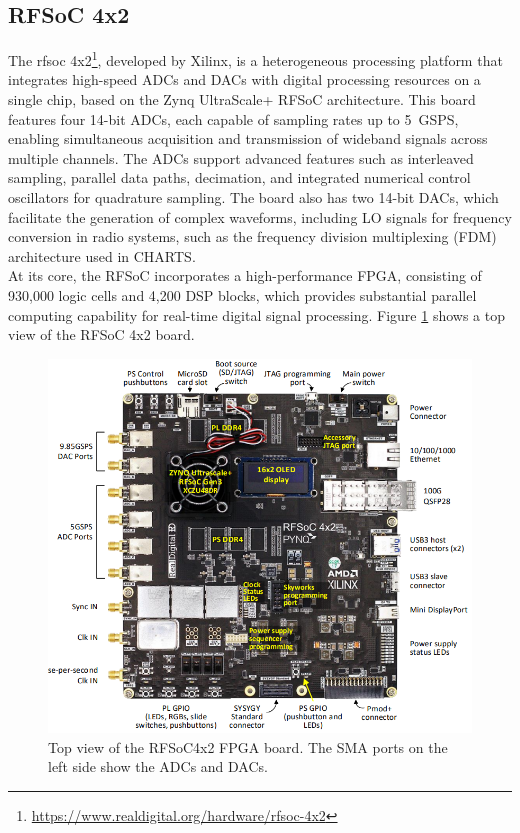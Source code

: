 \subsection{RFSoC 4x2}
\label{sec:rfsoc}
The \Gls{rfsoc} 4x2\footnote{\url{https://www.realdigital.org/hardware/rfsoc-4x2}}, developed by Xilinx, is a heterogeneous processing platform that integrates high-speed ADCs and DACs with digital processing resources on a single chip, based on the Zynq UltraScale+ RFSoC architecture. This board features four 14-bit ADCs, each capable of sampling rates up to 5~GSPS, enabling simultaneous acquisition and transmission of wideband signals across multiple channels. The ADCs support advanced features such as interleaved sampling, parallel data paths, decimation, and integrated numerical control oscillators for quadrature sampling. The board also has two 14-bit DACs, which facilitate the generation of complex waveforms, including LO signals for frequency conversion in radio systems, such as the frequency division multiplexing (FDM) architecture used in CHARTS.
\\

At its core, the RFSoC incorporates a high-performance FPGA, consisting of 930,000 logic cells and 4,200 DSP blocks, which provides substantial parallel computing capability for real-time digital signal processing. Figure \ref{fig:rfsoc_top_view} shows a top view of the RFSoC 4x2 board.
\begin{figure}
	\centering
	\includegraphics[scale=0.58]{../figures/rfsoc.png}
	\caption[RFSoC4x2 top view]{Top view of the RFSoC4x2 FPGA board. The SMA ports on the left side show the ADCs and DACs.}
	\label{fig:rfsoc_top_view}
\end{figure}